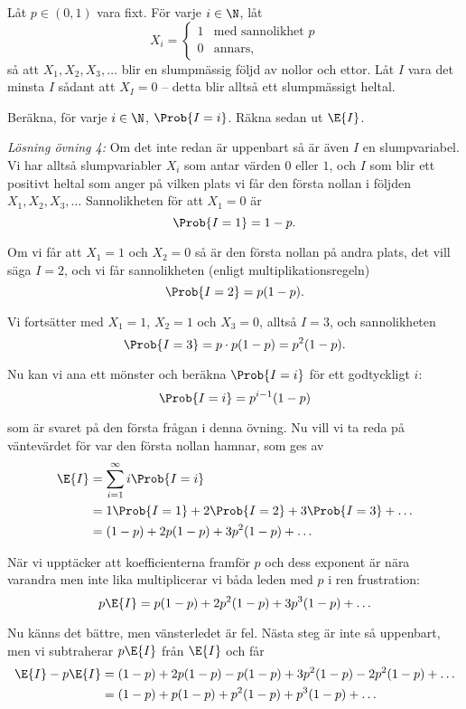 \documentclass[nobib]{tufte-handout}
\begin{document}
\begin{xca}
    Låt $p \in (0,1)$ vara fixt. För varje $i \in \N$, låt 
    $$X_i = \begin{cases}
        1  & \text{med sannolikhet }p\\
        0 & \text{annars},
    \end{cases}$$
    så att $X_1, X_2, X_3, \ldots$ blir en slumpmässig följd av nollor och ettor. Låt $I$ vara det minsta $I$ sådant att $X_I = 0$ -- detta blir alltså ett slumpmässigt heltal.

    Beräkna, för varje $i \in \N$, $\Prob{I = i}$. Räkna sedan ut $\E{I}$.
\end{xca}

\textit{Lösning övning 4:} Om det inte redan är uppenbart så är även $I$ en slumpvariabel. Vi har alltså slumpvariabler $X_i$ som antar värden $0$ eller $1$, och $I$ som blir ett positivt heltal som anger på vilken plats vi får den första nollan i följden $X_1, X_2, X_3, \ldots$ Sannolikheten för att $X_1=0$ är $$\Prob{I=1}=1-p.$$

Om vi får att $X_1=1$ och $X_2=0$ så är den första nollan på andra plats, det vill säga $I=2$, och vi får sannolikheten (enligt multiplikationsregeln)
$$\Prob{I=2}=p(1-p).$$

Vi fortsätter med $X_1=1$, $X_2=1$ och $X_3=0$, alltså $I=3$, och sannolikheten
$$\Prob{I=3}=p\cdot p(1-p)=p^2(1-p).$$

Nu kan vi ana ett mönster och beräkna $\Prob{I=i}$ för ett godtyckligt $i$:
$$\Prob{I=i}=p^{i-1}(1-p)$$

som är svaret på den första frågan i denna övning. Nu vill vi ta reda på väntevärdet för var den första nollan hamnar, som ges av
    \begin{align*}
        \E{I} &=\sum_{i=1}^{\infty} i\Prob{I=i}\\
        &=1\Prob{I=1}+2\Prob{I=2}+3\Prob{I=3}+\ldots\\
        &=(1-p)+2p(1-p)+3p^2(1-p)+\ldots
    \end{align*}

När vi upptäcker att koefficienterna framför $p$ och dess exponent är nära varandra men inte lika multiplicerar vi båda leden med $p$ i ren frustration:
$$p\E{I}=p(1-p)+2p^2(1-p)+3p^3(1-p)+\ldots$$

Nu känns det bättre, men vänsterledet är fel. Nästa steg är inte så uppenbart, men vi subtraherar $p\E{I}$ från $\E{I}$ och får
    \begin{align*}
        \E{I}-p\E{I} &=(1-p)+2p(1-p)-p(1-p)+3p^2(1-p)-2p^2(1-p)+\ldots\\
        &=(1-p)+p(1-p)+p^2(1-p)+p^3(1-p)+\ldots
    \end{align*} %
\end{document}
